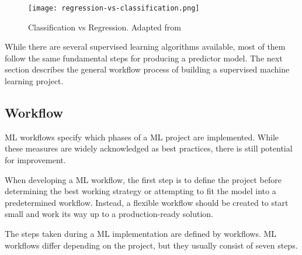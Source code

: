 \begin{figure}[htbp]
    \centering
    \texttt{[image: regression-vs-classification.png]}
    \caption{Classification vs Regression. Adapted from~\cite{Matanga2017AnalysisInterfaces}}
    \label{fig:regression_vs_classification}
\end{figure}


While there are several supervised learning algorithms available, most of them follow the same fundamental steps for producing a predictor model. The next section describes the general workflow process of building a supervised machine learning project.

\subsection{Workflow}\label{sec:workflow}

\gls{ML} workflows specify which phases of a \gls{ML} project are implemented. While these measures are widely acknowledged as best practices, there is still potential for improvement. 

When developing a \gls{ML} workflow, the first step is to define the project before determining the best working strategy or attempting to fit the model into a predetermined workflow. Instead, a flexible workflow should be created to start small and work its way up to a production-ready solution.

The steps taken during a \gls{ML} implementation are defined by workflows. \gls{ML} workflows differ depending on the project, but they usually consist of seven steps.

